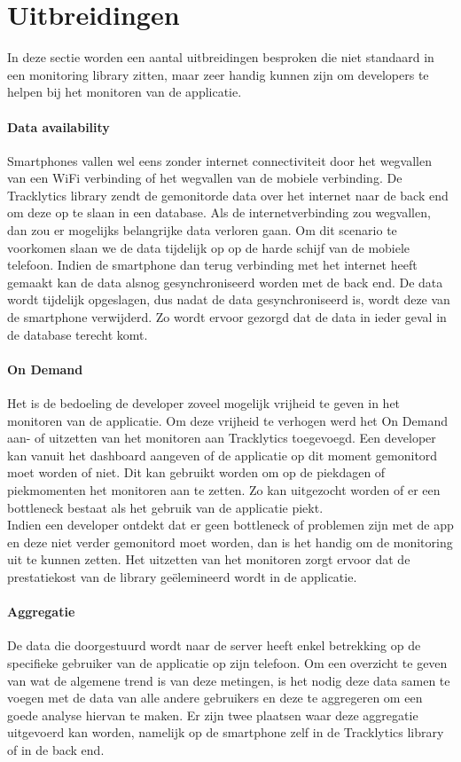 \section{Uitbreidingen}
In deze sectie worden een aantal uitbreidingen besproken die niet standaard in een monitoring library zitten, maar zeer handig kunnen zijn om developers te helpen bij het monitoren van de applicatie.

\paragraph{Data availability}
Smartphones vallen wel eens zonder internet connectiviteit door het wegvallen van een WiFi verbinding of het wegvallen van de mobiele verbinding. De Tracklytics library zendt de gemonitorde data over het internet naar de back end om deze op te slaan in een database. Als de internetverbinding zou wegvallen, dan zou er mogelijks belangrijke data verloren gaan. Om dit scenario te voorkomen slaan we de data tijdelijk op op de harde schijf van de mobiele telefoon. Indien de smartphone dan terug verbinding met het internet heeft gemaakt kan de data alsnog gesynchroniseerd worden met de back end. De data wordt tijdelijk opgeslagen, dus nadat de data gesynchroniseerd is, wordt deze van de smartphone verwijderd. Zo wordt ervoor gezorgd dat de data in ieder geval in de database terecht komt. 

\paragraph{On Demand}\label{par:OnDemand}
Het is de bedoeling de developer zoveel mogelijk vrijheid te geven in het monitoren van de applicatie. Om deze vrijheid te verhogen werd het On Demand aan- of uitzetten van het monitoren aan Tracklytics toegevoegd. Een developer kan vanuit het dashboard aangeven of de applicatie op dit moment gemonitord moet worden of niet. Dit kan gebruikt worden om op de piekdagen of piekmomenten het monitoren aan te zetten. Zo kan uitgezocht worden of er een bottleneck bestaat als het gebruik van de applicatie piekt. \\
Indien een developer ontdekt dat er geen bottleneck of problemen zijn met de app en deze niet verder gemonitord moet worden, dan is het handig om de monitoring uit te kunnen zetten. Het uitzetten van het monitoren zorgt ervoor dat de prestatiekost van de library ge\"elemineerd wordt in de applicatie.


\paragraph{Aggregatie}\label{Arch:Aggregatie}
De data die doorgestuurd wordt naar de server heeft enkel betrekking op de specifieke gebruiker van de applicatie op zijn telefoon. Om een overzicht te geven van wat de algemene trend is van deze metingen, is het nodig deze data samen te voegen met de data van alle andere gebruikers en deze te aggregeren om een goede analyse hiervan te maken. Er zijn twee plaatsen waar deze aggregatie uitgevoerd kan worden, namelijk op de smartphone zelf in de Tracklytics library of in de back end. \\

